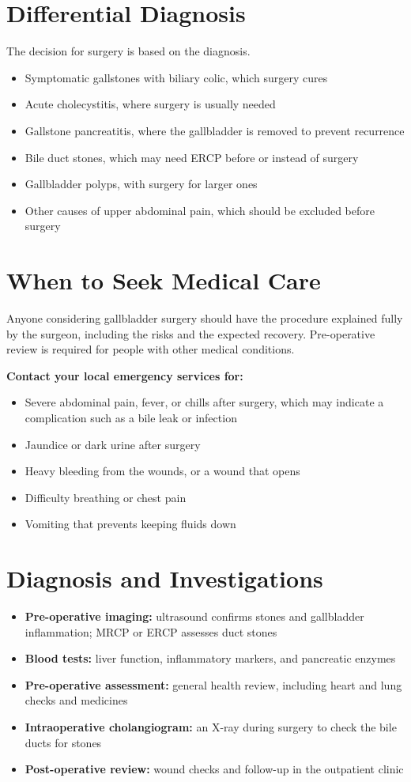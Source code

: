 \section*{Differential Diagnosis}
The decision for surgery is based on the diagnosis.
\begin{itemize}
    \item Symptomatic gallstones with biliary colic, which surgery cures
    \item Acute cholecystitis, where surgery is usually needed
    \item Gallstone pancreatitis, where the gallbladder is removed to prevent recurrence
    \item Bile duct stones, which may need ERCP before or instead of surgery
    \item Gallbladder polyps, with surgery for larger ones
    \item Other causes of upper abdominal pain, which should be excluded before surgery
\end{itemize}

\section*{When to Seek Medical Care}
Anyone considering gallbladder surgery should have the procedure explained fully by the surgeon, including the risks and the expected recovery. Pre-operative review is required for people with other medical conditions.

\textbf{Contact your local emergency services for:}
\begin{itemize}
    \item Severe abdominal pain, fever, or chills after surgery, which may indicate a complication such as a bile leak or infection
    \item Jaundice or dark urine after surgery
    \item Heavy bleeding from the wounds, or a wound that opens
    \item Difficulty breathing or chest pain
    \item Vomiting that prevents keeping fluids down
\end{itemize}

\section*{Diagnosis and Investigations}
\begin{itemize}
    \item \textbf{Pre-operative imaging:} ultrasound confirms stones and gallbladder inflammation; MRCP or ERCP assesses duct stones
    \item \textbf{Blood tests:} liver function, inflammatory markers, and pancreatic enzymes
    \item \textbf{Pre-operative assessment:} general health review, including heart and lung checks and medicines
    \item \textbf{Intraoperative cholangiogram:} an X-ray during surgery to check the bile ducts for stones
    \item \textbf{Post-operative review:} wound checks and follow-up in the outpatient clinic
\end{itemize}

